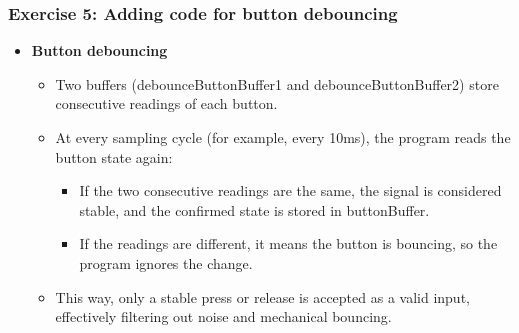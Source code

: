 \documentclass[a4paper,12pt]{article}
\begin{document}
\subsubsection{Exercise 5: Adding code for button debouncing}
\begin{itemize}
	\item[] \textbf{Button debouncing}
	\begin{itemize}
		\item[] Two buffers (debounceButtonBuffer1 and debounceButtonBuffer2) store consecutive readings of each button.
		\item[] At every sampling cycle (for example, every 10ms), the program reads the button state again:
		\begin{itemize}
			\item[] If the two consecutive readings are the same, the signal is considered stable, and the confirmed state is stored in buttonBuffer.
			\item[] If the readings are different, it means the button is bouncing, so the program ignores the change.
		\end{itemize}
		\item[] This way, only a stable press or release is accepted as a valid input, effectively filtering out noise and mechanical bouncing.
	\end{itemize}
\end{itemize}
\end{document}
